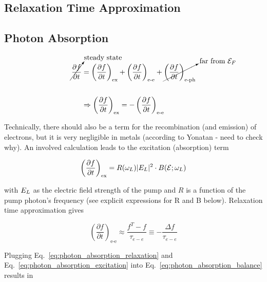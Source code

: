 \subsection{Relaxation Time Approximation}

\subsection{Photon Absorption}

\begin{align}
\cancelto{\text{steady state}}{ \frac{ \partial f }{ \partial t } } &= \left( \frac{ \partial f }{ \partial t }  \right)_{\text{ex}} + \left( \frac{ \partial f }{ \partial t }  \right)_{\text{e-e}} +  \cancelto{\text{far from }\mathcal{E}_{F}}{ \left( \frac{ \partial f }{ \partial t }  \right)_{\text{e-ph}} }\\ \\  &\Rightarrow\left( \frac{ \partial f }{ \partial t }  \right)_{\text{ex}} = - \left( \frac{ \partial f }{ \partial t }  \right)_{\text{e-e}}  
\label{eq:photon_absorption_balance}
\end{align}

Technically, there should also be a term for the recombination (and emission) of electrons, but it is very negligible in metals (according to Yonatan - need to check why).
An involved calculation leads to the excitation (absorption) term

\begin{equation}
\left( \frac{ \partial f }{ \partial t }  \right)_{\text{ex}} = R(\omega _{\scriptsize L})|E_{\scriptsize L}|^{2} \cdot B(\mathcal{E};\omega _{\scriptsize L}) 
\label{eq:photon_absorption_excitation}
\end{equation}
 
with $E_{\scriptsize L}$ as the electric field strength of the pump and $R$ is a function of the pump photon's frequency (see explicit expressions for R and B below). Relaxation time approximation gives

\begin{equation}
\left( \frac{ \partial f }{ \partial t }  \right)_{\text{e-e}} \approx \frac{f^{T}-f}{\tau_{e-e}} \equiv - \frac{\Delta f}{\tau_{e-e}}
\label{eq:photon_absorption_relaxation}
\end{equation}

Plugging Eq.~\eqref{eq:photon_absorption_relaxation} and Eq.~\eqref{eq:photon_absorption_excitation} into Eq.~\eqref{eq:photon_absorption_balance} results in

